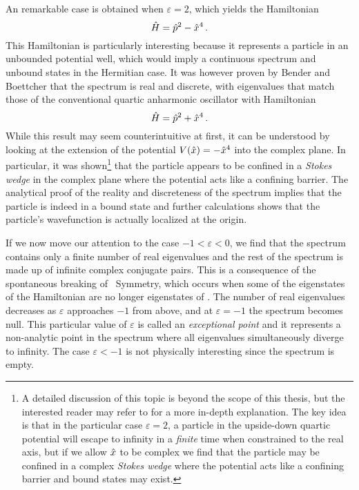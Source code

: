             An remarkable case is obtained when $\varepsilon = 2$, which yields the Hamiltonian
            \begin{equation}
                \hat{H} = \hat{p}^2 - \hat{x}^4
                \,\text{.}
            \end{equation}
            This Hamiltonian is particularly interesting because it represents a particle in an unbounded potential well, which would imply a continuous spectrum and unbound states in the Hermitian case. It was however proven by Bender and Boettcher \cite{Bender1998} that the spectrum is real and discrete, with eigenvalues that match those of the conventional quartic anharmonic oscillator with Hamiltonian
            \begin{equation}
                \hat{H} = \hat{p}^2 + \hat{x}^4
                \,\text{.}
            \end{equation}
            While this result may seem counterintuitive at first, it can be understood by looking at the extension of the potential $V\pqty{\hx} = -\hx^4$ into the complex plane. In particular, it was shown\footnote{A detailed discussion of this topic is beyond the scope of this thesis, but the interested reader may refer to \cite{Bender1998,bender2024} for a more in-depth explanation. The key idea is that in the particular case $\varepsilon = 2$, a particle in the upside-down quartic potential will escape to infinity in a \emph{finite} time when constrained to the real axis, but if we allow $\hat{x}$ to be complex we find that the particle may be confined in a complex \emph{Stokes wedge} where the potential acts like a confining barrier and bound states may exist.} that the particle appears to be confined in a \emph{Stokes wedge} in the complex plane where the potential acts like a confining barrier. The analytical proof of the reality and discreteness of the spectrum implies that the particle is indeed in a bound state and further calculations shows that the particle's wavefunction is actually localized at the origin.

            If we now move our attention to the case $-1 < \varepsilon < 0$, we find that the spectrum contains only a finite number of real eigenvalues and the rest of the spectrum is made up of infinite complex conjugate pairs. This is a consequence of the spontaneous breaking of \PT\ Symmetry, which occurs when some of the eigenstates of the Hamiltonian are no longer eigenstates of \hPT. The number of real eigenvalues decreases as $\varepsilon$ approaches $-1$ from above, and at $\varepsilon = -1$ the spectrum becomes null. This particular value of $\varepsilon$ is called an \emph{exceptional point} and it represents a non-analytic point in the spectrum where all eigenvalues simultaneously diverge to infinity. The case $\varepsilon < -1$ is not physically interesting since the spectrum is empty.
